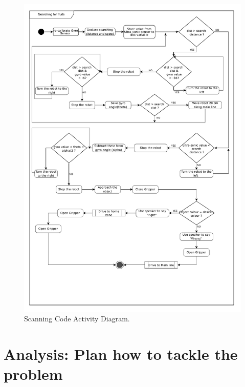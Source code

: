 \begin{figure}[!ht]
	\centering
	\includegraphics[width=0.95\linewidth]{export-1.pdf}
	\vspace{-4mm}
	\caption{Scanning Code Activity Diagram.}
	\label{fig:scaddingActivityDiagram}
\end{figure}
\newpage
\section{Analysis: Plan how to tackle the problem}\label{sec:softwareEngineering}
